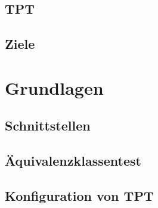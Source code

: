		\section{TPT}
			
		
		\section{Ziele}
			
	
			
			
		\chapter{Grundlagen}
			
			\section{Schnittstellen}
				
			\section{Äquivalenzklassentest}%
				
			\section{Konfiguration von TPT}
				

